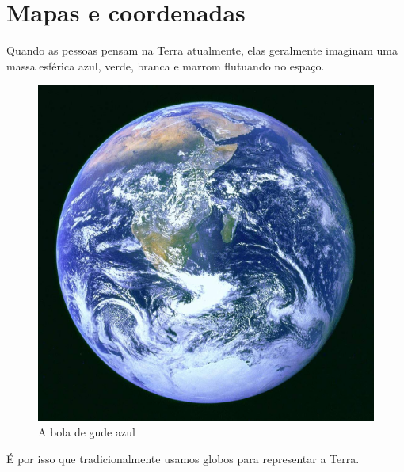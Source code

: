 \documentclass[
]{krantz}
\begin{document}
\hypertarget{mapas-e-coordenadas}{%
\section{Mapas e coordenadas}\label{mapas-e-coordenadas}}

Quando as pessoas pensam na Terra atualmente, elas geralmente imaginam uma massa esférica azul, verde, branca e marrom flutuando no espaço.

\begin{figure}
\centering
\includegraphics{media/modulo0/blue-marble.jpg}
\caption{A bola de gude azul}
\end{figure}

É por isso que tradicionalmente usamos globos para representar a Terra.
\end{document}
